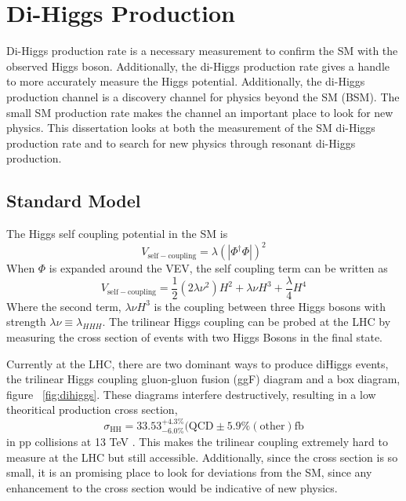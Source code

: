 \chapter{Di-Higgs Production}
\label{chap:dihiggs}
Di-Higgs production rate is a necessary measurement to confirm the SM with the observed Higgs boson. Additionally, the di-Higgs production rate gives a handle to more accurately measure the Higgs potential. Additionally, the di-Higgs production channel is a discovery channel for physics beyond the SM (BSM). The small SM production rate makes the channel an important place to look for new physics. This dissertation looks at both the measurement of the SM di-Higgs production rate and to search for new physics through resonant di-Higgs production. 
\section{Standard Model}
The Higgs self coupling potential in the SM is
\begin{equation}
V_{\mathrm{self-coupling}} = \lambda(|\Phi^{\dagger}\Phi|)^{2}
\end{equation}
When ${\Phi}$ is expanded around the VEV, the self coupling term can be written as
\begin{equation}
V_{\mathrm{self-coupling}} = \frac{1}{2}(2\lambda\nu^{2})H^{2} + \lambda\nu H^{3} + \frac{\lambda}{4}H^{4}
\end{equation}
Where the second term, ${\lambda\nu H^{3}}$ is the coupling between three Higgs bosons with strength ${\lambda\nu \equiv \lambda_{HHH}}$\cite{Belusevic:2004pz}. The trilinear Higgs coupling can be probed at the LHC by measuring the cross section of events with two Higgs Bosons in the final state.\newline



\indent  Currently at the LHC, there are two dominant ways to produce diHiggs events, the trilinear Higgs coupling gluon-gluon fusion (ggF) diagram and a box diagram, figure ~\ref{fig:dihiggs}. These diagrams interfere destructively, resulting in a low theoritical production cross section, 
\begin{equation}
\sigma_{\mathrm{HH}} = 33.53^{+4.3\%}_{-6.0\%} (\mathrm{QCD}\pm{5.9\%} \mathrm{(other)} \mathrm{fb}
\end{equation}
in pp collisions at 13 TeV \cite{Sirunyan:2018two}. This makes the trilinear coupling extremely hard to measure at the LHC but still accessible. Additionally, since the cross section is so small, it is an promising place to look for deviations from the SM, since any enhancement to the cross section would be indicative of new physics.

